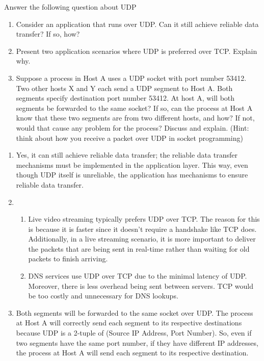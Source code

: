 \documentclass{report}
\begin{document}
\newpage
\begin{problem}
Answer the following question about UDP
\begin{enumerate}
\item Consider an application that runs over UDP. Can it still achieve reliable data transfer? 
If so, how?
\item Present two application scenarios where UDP is preferred over TCP. Explain why.
\item  
Suppose a process in Host A uses a UDP socket with port number 53412. Two other hosts X and Y each send a UDP segment to Host A. Both segments specify destination port number 53412.
At host A, will both segments be forwarded to the same socket? 
If so, can the process at Host A know that these two segments are from two different hosts, and how?
If not, would that cause any problem for the process?
Discuss and explain. (Hint: think about how you receive a packet over UDP in socket programming)
\end{enumerate}

\medskip

\begin{answer}{40em}
    \begin{enumerate}[label=(\alph*)]
        \item Yes, it can still achieve reliable data transfer; the reliable data transfer mechanisms
            must be implemented in the application layer. This way, even though UDP itself is unreliable,
            the application has mechanisms to ensure reliable data transfer.
        \item 
            \begin{enumerate}[label=\textit{(\roman*)}]
                \item Live video streaming typically prefers UDP over TCP. The reason for this is 
                    because it is faster since it doesn't require a handshake like TCP does. 
                    Additionally, in a live streaming scenario, it is more important to deliver the
                    packets that are being sent in real-time rather than waiting for old packets to
                    finish arriving.
                \item DNS services use UDP over TCP due to the minimal latency of UDP. Moreover, there
                    is less overhead being sent between servers. TCP would be too costly and unnecessary
                    for DNS lookups.
            \end{enumerate}
        \item Both segments will be forwarded to the same socket over UDP.
            The process at Host A will correctly send each segment to its respective destinations
            because UDP is a 2-tuple of (Source IP Address, Port Number). So, even if two segments
            have the same port number, if they have different IP addresses, the process at Host A
            will send each segment to its respective destination.
    \end{enumerate}
\end{answer}
\end{problem}
\end{document}
